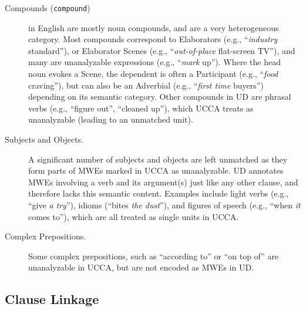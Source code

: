 \documentclass[11pt,a4paper]{article}
\newcommand{\oa}[1]{\footnote{\color{red}OA: #1}}
\begin{document}
\begin{description}
    \item[Compounds (\texttt{compound})] in English are mostly noun compounds,
        and are a very heterogeneous category.
        Most compounds correspond to Elaborators (e.g., ``\textit{industry} standard''),
        or Elaborator Scenes (e.g., ``\textit{out-of-place} flat-screen TV''),
        and many are unanalyzable expressions (e.g., ``\textit{mark} up'').
        Where the head noun evokes a Scene, the dependent is often a Participant
        (e.g., ``\textit{food} craving''), but can also be an Adverbial 
        (e.g., ``\textit{first time} buyers'') depending on its semantic category.
        Other compounds in UD are phrasal verbs (e.g., ``figure out'', ``cleaned up''),
        which UCCA treats as unanalyzable (leading to an unmatched unit). 
            
    \item[Subjects and Objects.]
      A significant number of subjects and objects are left unmatched as they
      form parts of MWEs marked in UCCA as unanalyzable. UD annotates
      MWEs involving a verb and its argument(s) just like any other clause, and therefore
      lacks this semantic content. Examples include light verbs (e.g., ``give {\it a try}''),
      idioms (``bites {\it the dust}''), and figures of speech (e.g., ``when \textit{it} comes to''),
      which are all treated as single units in UCCA.
      
    \item[Complex Prepositions.] Some complex prepositions, such as ``according to'' or ``on top of''
      are unanalyzable in UCCA, but are not encoded as MWEs in UD.

%     
\end{description}


\subsection{Clause Linkage}\label{sec:linkage}
\end{document}
